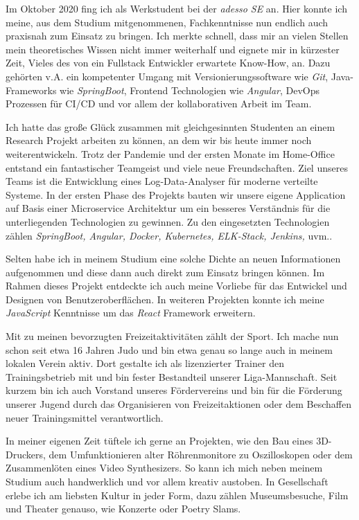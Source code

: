 \documentclass[11pt, a4paper]{awesome-cv}
\begin{document}
\begin{cvletter}
  Im Oktober 2020 fing ich als Werkstudent bei der \textit{adesso SE} an. Hier konnte ich meine, aus dem Studium mitgenommenen, Fachkenntnisse nun endlich auch praxisnah zum Einsatz zu bringen. Ich merkte schnell, dass mir an vielen Stellen mein theoretisches Wissen nicht immer weiterhalf und eignete mir in kürzester Zeit, Vieles des von ein Fullstack Entwickler erwartete Know-How, an. Dazu gehörten v.A. ein kompetenter Umgang mit Versionierungssoftware wie \textit{Git}, Java-Frameworks wie \textit{SpringBoot}, Frontend Technologien wie \textit{Angular}, DevOps Prozessen für CI/CD und vor allem der kollaborativen Arbeit im Team.

  Ich hatte das große Glück zusammen mit gleichgesinnten Studenten an einem Research Projekt arbeiten zu können, an dem wir bis heute immer noch weiterentwickeln. Trotz der Pandemie und der ersten Monate im Home-Office entstand ein fantastischer Teamgeist und viele neue Freundschaften. Ziel unseres Teams ist die Entwicklung eines Log-Data-Analyser für moderne verteilte Systeme. In der ersten Phase des Projekts bauten wir unsere eigene Application auf Basis einer Microservice Architektur um ein besseres Verständnis für die unterliegenden Technologien zu gewinnen. Zu den eingesetzten Technologien zählen \textit{SpringBoot, Angular, Docker, Kubernetes, ELK-Stack, Jenkins,} uvm..

  Selten habe ich in meinem Studium eine solche Dichte an neuen Informationen aufgenommen und diese dann auch direkt zum Einsatz bringen können. Im Rahmen dieses Projekt entdeckte ich auch meine Vorliebe für das Entwickel und Designen von Benutzeroberflächen. In weiteren Projekten konnte ich meine \textit{JavaScript} Kenntnisse um das \textit{React} Framework erweitern.


  Mit zu meinen bevorzugten Freizeitaktivitäten zählt der Sport. Ich mache nun schon seit etwa 16 Jahren Judo und bin etwa genau so lange auch in meinem lokalen Verein aktiv. Dort gestalte ich als lizenzierter Trainer den Trainingsbetrieb mit und bin fester Bestandteil unserer Liga-Mannschaft. Seit kurzem bin ich auch Vorstand unseres Fördervereins und bin für die Förderung unserer Jugend durch das Organisieren von Freizeitaktionen oder dem Beschaffen neuer Trainingsmittel verantwortlich.

  In meiner eigenen Zeit tüftele ich gerne an Projekten, wie den Bau eines 3D-Druckers, dem Umfunktionieren alter Röhrenmonitore zu Oszilloskopen oder dem Zusammenlöten eines Video Synthesizers. So kann ich mich neben meinem Studium auch handwerklich und vor allem kreativ austoben. In Gesellschaft erlebe ich am liebsten Kultur in jeder Form, dazu zählen Museumsbesuche, Film und Theater genauso, wie Konzerte oder Poetry Slams.


\end{cvletter}
\end{document}
